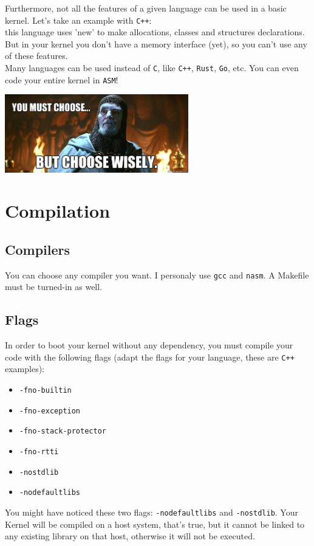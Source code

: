 \documentclass{42-en}
\begin{document}
            Furthermore, not all the features of a given language can be used
            in a basic kernel. Let's take an example with \texttt{C++}:\\
            this language uses 'new' to make allocations, classes and
            structures declarations. But in your kernel you don't have a memory
            interface (yet), so you can't use any of these features.\\

            Many languages can be used instead of \texttt{C},
            like \texttt{C++}, \texttt{Rust}, \texttt{Go}, etc.
            You can even code your entire kernel in \texttt{ASM}!\\
            \begin{center}
              \includegraphics[width=8cm]{choose.jpg}
            \end{center}

\newpage


    \section{Compilation}
        \subsection{Compilers}
            You can choose any compiler you want. I personaly use \texttt{gcc}
            and \texttt{nasm}. A Makefile must be turned-in as well.
        \subsection{Flags}
            In order to boot your kernel without any dependency, you must
            compile your code with the following flags (adapt the flags for
            your language, these are \texttt{C++} examples):
            \begin{itemize}\itemsep1pt
                \item \texttt{-fno-builtin}
                \item \texttt{-fno-exception}
                \item \texttt{-fno-stack-protector}
                \item \texttt{-fno-rtti}
                \item \texttt{-nostdlib}
                \item \texttt{-nodefaultlibs}
            \end{itemize}
            You might have noticed these two flags: \texttt{-nodefaultlibs}
            and \texttt{-nostdlib}. Your Kernel will be compiled on a host
            system, that's true, but it cannot be linked to any existing
            library on that host, otherwise it will not be executed.
\end{document}
